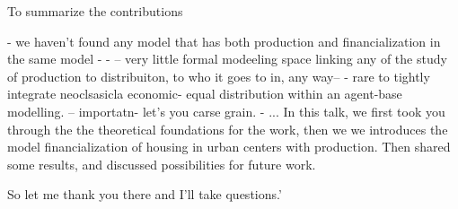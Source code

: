 \documentclass[]{article}
\begin{document}
To summarize the contributions

- we haven't found any model that has both production and financialization in the same model - 
- -- very little formal modeeling space linking any of the study of production to distribuiton, to who it goes to in, any way-- 
- rare to tightly integrate neoclsasicla economic- equal distribution within an agent-base modelling. -- importatn- let's you carse grain.
- ...
In this talk, we first took you through the the theoretical foundations for the work, then we we introduces the model financialization of housing in urban centers with production. Then shared some results, and  discussed possibilities for future work. 

So let me thank you there and I'll take questions.'
\end{document}
